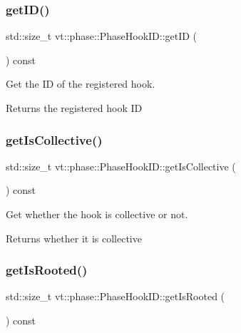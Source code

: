 \subsubsection{\texorpdfstring{get\+I\+D()}{getID()}}
{\footnotesize\ttfamily std\+::size\+\_\+t vt\+::phase\+::\+Phase\+Hook\+I\+D\+::get\+ID (\begin{DoxyParamCaption}{ }\end{DoxyParamCaption}) const\hspace{0.3cm}{\ttfamily [inline]}}



Get the ID of the registered hook. 

\begin{DoxyReturn}{Returns}
the registered hook ID 
\end{DoxyReturn}
\mbox{\label{structvt_1_1phase_1_1_phase_hook_i_d_ad3f0edab6498385a2611f41f7a658ffa}} 
\subsubsection{\texorpdfstring{get\+Is\+Collective()}{getIsCollective()}}
{\footnotesize\ttfamily std\+::size\+\_\+t vt\+::phase\+::\+Phase\+Hook\+I\+D\+::get\+Is\+Collective (\begin{DoxyParamCaption}{ }\end{DoxyParamCaption}) const\hspace{0.3cm}{\ttfamily [inline]}}



Get whether the hook is collective or not. 

\begin{DoxyReturn}{Returns}
whether it is collective 
\end{DoxyReturn}
\mbox{\label{structvt_1_1phase_1_1_phase_hook_i_d_a0084724ed8635e3307198227d7055a9a}} 
\subsubsection{\texorpdfstring{get\+Is\+Rooted()}{getIsRooted()}}
{\footnotesize\ttfamily std\+::size\+\_\+t vt\+::phase\+::\+Phase\+Hook\+I\+D\+::get\+Is\+Rooted (\begin{DoxyParamCaption}{ }\end{DoxyParamCaption}) const\hspace{0.3cm}{\ttfamily [inline]}}



